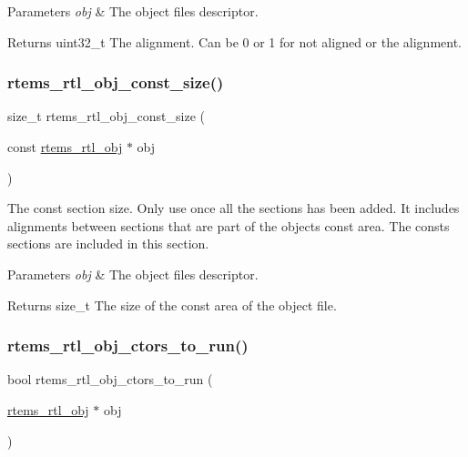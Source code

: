 \begin{DoxyParams}{Parameters}
{\em obj} & The object file\textquotesingle{}s descriptor. \\
\hline
\end{DoxyParams}
\begin{DoxyReturn}{Returns}
uint32\+\_\+t The alignment. Can be 0 or 1 for not aligned or the alignment. 
\end{DoxyReturn}
\mbox{\label{rtl-obj_8c_a2ce7672560ab13914b32a683650c03cf}} 
\subsubsection{\texorpdfstring{rtems\_rtl\_obj\_const\_size()}{rtems\_rtl\_obj\_const\_size()}}
{\footnotesize\ttfamily size\+\_\+t rtems\+\_\+rtl\+\_\+obj\+\_\+const\+\_\+size (\begin{DoxyParamCaption}\item[{const \mbox{\hyperlink{structrtems__rtl__obj}{rtems\+\_\+rtl\+\_\+obj}} $\ast$}]{obj }\end{DoxyParamCaption})}

The const section size. Only use once all the sections has been added. It includes alignments between sections that are part of the object\textquotesingle{}s const area. The consts sections are included in this section.


\begin{DoxyParams}{Parameters}
{\em obj} & The object file\textquotesingle{}s descriptor. \\
\hline
\end{DoxyParams}
\begin{DoxyReturn}{Returns}
size\+\_\+t The size of the const area of the object file. 
\end{DoxyReturn}
\mbox{\label{rtl-obj_8c_a1d4c73beba22bae24a66704baa5a8e5a}} 
\subsubsection{\texorpdfstring{rtems\_rtl\_obj\_ctors\_to\_run()}{rtems\_rtl\_obj\_ctors\_to\_run()}}
{\footnotesize\ttfamily bool rtems\+\_\+rtl\+\_\+obj\+\_\+ctors\+\_\+to\+\_\+run (\begin{DoxyParamCaption}\item[{\mbox{\hyperlink{structrtems__rtl__obj}{rtems\+\_\+rtl\+\_\+obj}} $\ast$}]{obj }\end{DoxyParamCaption})}

